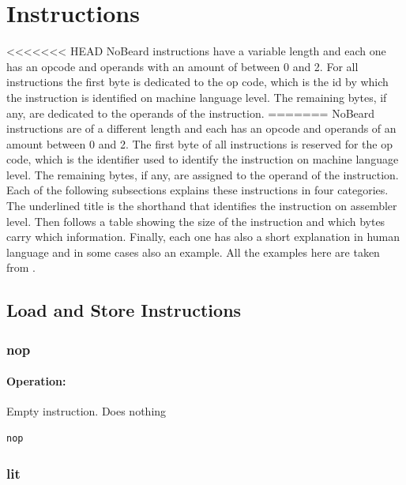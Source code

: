 \section{Instructions}\label{sec:instructions}
<<<<<<< HEAD
NoBeard instructions have a variable length and each one has an opcode and operands with an amount of between 0 and 2. For all instructions the first byte is dedicated to the op code, which is the id by which the instruction is identified on machine language level. The remaining bytes, if any, are dedicated to the operands of the instruction. 
=======
NoBeard instructions are of a different length and each has an opcode and operands of an amount between 0 and 2. The first byte of all instructions is reserved for the op code, which is the identifier used to identify the instruction on machine language level. The remaining bytes, if any, are assigned to the operand of the instruction.
Each of the following subsections explains these instructions in four categories. The underlined title is the shorthand that identifies the instruction on assembler level. Then follows a table showing the size of the instruction and which bytes carry which information. Finally, each one has also a short explanation in human language and in some cases also an example. All the examples here are taken from \cite{bauer_p._2017}.

\subsection{Load and Store Instructions}
\subsubsection{nop}

\paragraph{Operation:}
Empty instruction. Does nothing

\begin{lstlisting}
nop
\end{lstlisting}

\subsubsection{lit}


